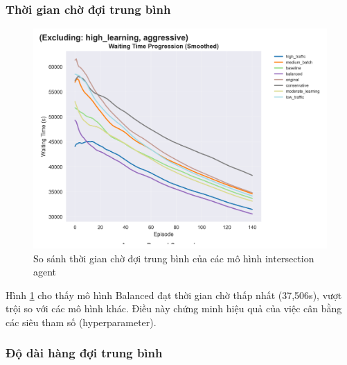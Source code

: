\subsubsection{Thời gian chờ đợi trung bình}

\begin{figure}[!htp]
    \centering
    \includegraphics[width=\textwidth]{figures/individual_plots/intersection_filtered_waiting_time.png}
    \caption{So sánh thời gian chờ đợi trung bình của các mô hình intersection agent}
    \label{fig:intersection_filtered_waiting_time}
\end{figure}

Hình \ref{fig:intersection_filtered_waiting_time} cho thấy mô hình Balanced đạt thời
gian chờ thấp nhất (37,506s), vượt trội so với các mô hình khác. Điều này chứng minh
hiệu quả của việc cân bằng các siêu tham số (hyperparameter).

\subsubsection{Độ dài hàng đợi trung bình}


